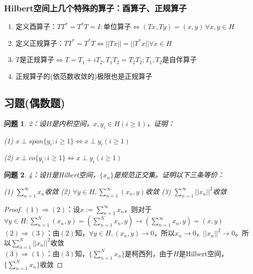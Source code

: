 \documentclass[a4paper, 12pt]{ctexart}
\newtheorem*{theorem}{问题}%
\begin{document}
\subsubsection{Hilbert空间上几个特殊的算子：酉算子、正规算子}
\begin{enumerate}
    \item 定义酉算子：$TT^*=T^*T=I:\text{单位算子}\iff (Tx,Ty)=(x,y)\,\forall x,y \in H$
    \item 定义正规算子：$TT^*=T^*T\iff ||Tx||=||T^*x|| \forall x\in H$
    \item $T$是正规算子$\iff T=T_1+iT_2,T_1T_2=T_2T_2;T_1,T_2\text{是自伴算子}$
    \item 正规算子的(依范数收敛的)极限也是正规算子
\end{enumerate}

\subsection{习题(偶数题)}

\begin{theorem}
2：设$H$是内积空间，$x,y_i \in H(i \geq 1)$，证明：

(1) $x \perp \overline{span}\{ y_i:i\geq 1 \} \iff x \perp y_i(i \geq 1)$

(2) $x \perp \overline{co}\{ y_i:i\geq 1 \} \iff x \perp y_i(i \geq 1)$
\end{theorem}


\begin{theorem}
4：设$H$是Hilbert空间，$\{ x_n \}$是规范正交集。证明以下三条等价：

(1) $\sum_{n=1}^\infty x_n$收敛  (2) $\forall y\in H,\sum_{n=1}^\infty (x_n,y)$收敛  (3) $\sum_{n=1}^\infty ||x_n||^2$收敛
\end{theorem}

\begin{proof}
$(1)\Rightarrow (2)$：设$x:=\sum_{n=1}^\infty x_n$，则对于$\forall y \in H:\sum_{n=1}^N (x_n,y) =(\sum_{n=1}^N x_n,y)\to  (\sum_{n=1}^\infty x_n,y)=(x,y)$
\\
$(2)\Rightarrow (3)$：由$(2)$知，$\forall y\in H,(x_n,y)\to 0$，所以$x_n \to 0$，$||x_n||^2\to 0$。所以$\sum_{n=1}^N ||x_n||^2$收敛
\\
$(3)\Rightarrow (1)$：由$(3)$知，$\{\sum_{n=1}^N x_n\}$是柯西列，由于$H$是Hilbert空间，$\{\sum_{n=1}^N x_n\}$收敛
\end{proof}

\end{document}
